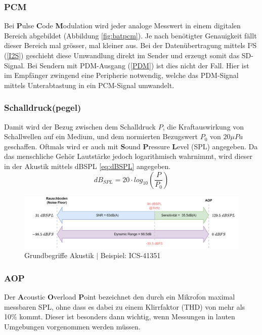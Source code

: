 \documentclass[12pt]{article}
\begin{document}
	\subsubsection*{PCM}
	Bei \textbf{P}ulse \textbf{C}ode \textbf{M}odulation wird jeder analoge Messwert in einem digitalen Bereich abgebildet (Abbildung \ref{fig:batpcm}). Je nach benötigter Genauigkeit fällt dieser Bereich mal grösser, mal kleiner aus. Bei der Datenübertragung mittels I²S (\ref{I2S}) geschieht diese Umwandlung direkt im Sender und erzeugt somit das SD-Signal. Bei Sendern mit PDM-Ausgang (\ref{PDM}) ist dies nicht der Fall. Hier ist im Empfänger zwingend eine Peripherie notwendig, welche das PDM-Signal mittels Unterabtastung in ein PCM-Signal umwandelt.
	\subsubsection*{Schalldruck(pegel)}
	Damit wird der Bezug zwischen dem Schalldruck \textbf{$P$}, die Kraftauswirkung von Schallwellen auf ein Medium, und dem normierten Bezugswert \textbf{$P_0$} von $20 \mu Pa$ geschaffen. Oftmals wird er auch mit \textbf{S}ound \textbf{P}ressure \textbf{L}evel (SPL) angegeben. Da das menschliche Gehör Lautstärke jedoch logarithmisch wahrnimmt, wird dieser in der Akustik mittels dBSPL \ref{eq:dBSPL} angegeben.
	\begin{equation}\label{eq:dBSPL}
		dB_{SPL} = 20 \cdot log_{10}(\frac{P}{P_0})
	\end{equation}
	\begin{figure}[H]
		\centering
		\includegraphics[width=\linewidth]{images/BAT_PDM_Grundbegriffe}
		\caption{Grundbegriffe Akustik $\vert$ Beispiel: ICS-41351}
		\label{fig:batpdmgrundbegriffe}
	\end{figure}
	\subsubsection*{AOP} \label{AOP}
	Der \textbf{A}coustic \textbf{O}verload \textbf{P}oint bezeichnet den durch ein Mikrofon maximal messbaren SPL, ohne dass es dabei zu einem Klirrfaktor (THD) von mehr als 10\% kommt. Dieser ist besonders dann wichtig, wenn Messungen in lauten Umgebungen vorgenommen werden müssen.
\end{document}
